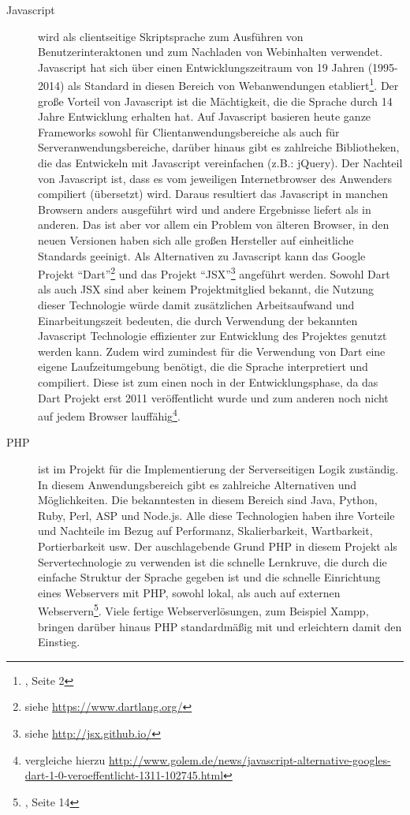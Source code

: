 \begin{description}
  \clearpage
  \item[Javascript] wird als clientseitige Skriptsprache zum Ausführen von Benutzerinteraktonen und zum Nachladen von Webinhalten verwendet. Javascript hat sich über einen Entwicklungszeitraum von 19 Jahren (1995-2014) als Standard in diesen Bereich von Webanwendungen etabliert\footnote{\citet{powers2007}, Seite 2}. Der große Vorteil von Javascript ist die Mächtigkeit, die die Sprache durch 14 Jahre Entwicklung erhalten hat. Auf Javascript basieren heute ganze Frameworks sowohl für Clientanwendungsbereiche als auch für Serveranwendungsbereiche\footnotemark, darüber hinaus gibt es zahlreiche Bibliotheken, die das Entwickeln mit Javascript vereinfachen (z.B.: jQuery). Der Nachteil von Javascript ist, dass es vom jeweiligen Internetbrowser des Anwenders compiliert (übersetzt) wird. Daraus resultiert das Javascript in manchen Browsern anders ausgeführt wird und andere Ergebnisse liefert als in anderen. Das ist aber vor allem ein Problem von älteren Browser, in den neuen Versionen haben sich alle großen Hersteller auf einheitliche Standards geeinigt. Als Alternativen zu Javascript kann das Google Projekt "`Dart"'\footnote{siehe \url{https://www.dartlang.org/}} und das Projekt "`JSX"'\footnote{siehe \url{http://jsx.github.io/}} angeführt werden. Sowohl Dart als auch JSX sind aber keinem Projektmitglied bekannt, die Nutzung dieser Technologie würde damit zusätzlichen Arbeitsaufwand und Einarbeitungszeit bedeuten, die durch Verwendung der bekannten Javascript Technologie effizienter zur Entwicklung des Projektes genutzt werden kann. Zudem wird zumindest für die Verwendung von Dart eine eigene Laufzeitumgebung benötigt, die die Sprache interpretiert und compiliert. Diese ist zum einen noch in der Entwicklungsphase, da das Dart Projekt erst 2011 veröffentlicht wurde und zum anderen noch nicht auf jedem Browser lauffähig\footnote{vergleiche hierzu \url{http://www.golem.de/news/javascript-alternative-googles-dart-1-0-veroeffentlicht-1311-102745.html}}.


  \item[PHP] ist im Projekt für die Implementierung der Serverseitigen Logik zuständig. In diesem Anwendungsbereich gibt es zahlreiche Alternativen und Möglichkeiten. Die bekanntesten in diesem Bereich sind Java, Python, Ruby, Perl, ASP und 
  Node.js. Alle diese Technologien haben ihre Vorteile und Nachteile im Bezug auf Performanz, Skalierbarkeit, Wartbarkeit, Portierbarkeit usw. Der auschlagebende Grund PHP in diesem Projekt als Servertechnologie zu verwenden ist die schnelle Lernkruve, die durch die einfache Struktur der Sprache gegeben ist und die schnelle Einrichtung eines Webservers mit PHP, sowohl lokal, als auch auf externen Webservern\footnote{\citet{peyton2005}, Seite 14}. Viele fertige Webserverlösungen, zum Beispiel Xampp, bringen darüber hinaus PHP standardmäßig mit und erleichtern damit den Einstieg.


\end{description}
